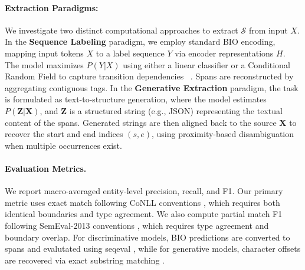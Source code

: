 \documentclass[11pt]{article}
\begin{document}
\paragraph{Extraction Paradigms:} We investigate two distinct computational  approaches to extract $\mathcal{S}$ from input $X$. In the \textbf{Sequence Labeling} paradigm, we employ standard BIO encoding, mapping input tokens $X$ to a label sequence $Y$ via encoder representations $H$. The model maximizes $P(Y|X)$ using either a linear classifier or a Conditional Random Field to capture transition dependencies ~\cite{Lafferty2001}. Spans are reconstructed by aggregating contiguous tags. In the \textbf{Generative Extraction} paradigm, the task is formulated as text-to-structure generation, where the model estimates $P(\mathbf{Z} | \mathbf{X})$, and $\mathbf{Z}$ is a structured string (e.g., JSON) representing the textual content of the spans. Generated strings are then aligned back to the source $\mathbf{X}$ to recover the start and end indices $(s, e)$, using proximity-based disambiguation when multiple occurrences exist.


\paragraph{Evaluation Metrics.} We report macro-averaged entity-level precision, recall, and F1. Our primary metric uses exact match following CoNLL conventions \cite{tjong2003introduction}, which requires both identical boundaries and type agreement. We also compute partial match F1 following SemEval-2013 conventions \cite{segura-bedmar-etal-2013-semeval}, which requires type agreement and boundary overlap. For discriminative models, BIO predictions are converted to spans and evalutated using seqeval \cite{seqeval}, while for generative models, character offsets are recovered via exact substring matching \cite{wang2023gptner}.
\end{document}
